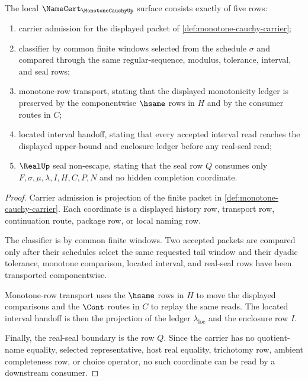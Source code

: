 \begin{theorem}
\label{thm:monotone-cauchy-namecert-obligation-surface}
The local $\NameCert_{\MonotoneCauchyUp}$ surface consists exactly of five rows:
\begin{enumerate}
\item carrier admission for the displayed packet of \autoref{def:monotone-cauchy-carrier};
\item classifier by common finite windows selected from the schedule $\sigma$ and compared through the same regular-sequence, modulus, tolerance, interval, and seal rows;
\item monotone-row transport, stating that the displayed monotonicity ledger is preserved by the componentwise $\hsame$ rows in $H$ and by the consumer routes in $C$;
\item located interval handoff, stating that every accepted interval read reaches the displayed upper-bound and enclosure ledger before any real-seal read;
\item $\RealUp$ seal non-escape, stating that the seal row $Q$ consumes only $F,\sigma,\mu,\lambda,I,H,C,P,N$ and no hidden completion coordinate.
\end{enumerate}
\end{theorem}
\begin{proof}
Carrier admission is projection of the finite packet in \autoref{def:monotone-cauchy-carrier}. Each coordinate is a displayed history row, transport row, continuation route, package row, or local naming row.

The classifier is by common finite windows. Two accepted packets are compared only after their schedules select the same requested tail window and their dyadic tolerance, monotone comparison, located interval, and real-seal rows have been transported componentwise.

Monotone-row transport uses the $\hsame$ rows in $H$ to move the displayed comparisons and the $\Cont$ routes in $C$ to replay the same reads. The located interval handoff is then the projection of the ledger $\lambda_{\mathrm{loc}}$ and the enclosure row $I$.

Finally, the real-seal boundary is the row $Q$. Since the carrier has no quotient-name equality, selected representative, host real equality, trichotomy row, ambient completeness row, or choice operator, no such coordinate can be read by a downstream consumer.
\end{proof}

